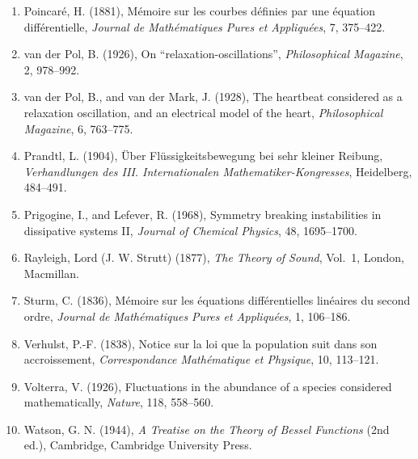 \documentclass[11pt,a4paper]{article}
\numberwithin{equation}{section}
\theoremstyle{definition}
\begin{document}
\begin{enumerate}
\item Poincar\'e, H. (1881), M\'emoire sur les courbes d\'efinies par une \'equation diff\'erentielle, \emph{Journal de Math\'ematiques Pures et
Appliqu\'ees}, 7, 375--422.
\item van der Pol, B. (1926), On ``relaxation-oscillations'', \emph{Philosophical Magazine}, 2, 978--992.
\item van der Pol, B., and van der Mark, J. (1928), The heartbeat considered as a relaxation oscillation, and an electrical model of the heart,
\emph{Philosophical Magazine}, 6, 763--775.
\item Prandtl, L. (1904), \"Uber Fl\"ussigkeitsbewegung bei sehr kleiner Reibung, \emph{Verhandlungen des III. Internationalen
Mathematiker-Kongresses}, Heidelberg, 484--491.
\item Prigogine, I., and Lefever, R. (1968), Symmetry breaking instabilities in dissipative systems II, \emph{Journal of Chemical Physics}, 48,
1695--1700.
\item Rayleigh, Lord (J. W. Strutt) (1877), \emph{The Theory of Sound}, Vol.~1, London, Macmillan.
\item Sturm, C. (1836), M\'emoire sur les \'equations diff\'erentielles lin\'eaires du second ordre, \emph{Journal de Math\'ematiques Pures et
Appliqu\'ees}, 1, 106--186.
\item Verhulst, P.-F. (1838), Notice sur la loi que la population suit dans son accroissement, \emph{Correspondance Math\'ematique et Physique}, 10,
113--121.
\item Volterra, V. (1926), Fluctuations in the abundance of a species considered mathematically, \emph{Nature}, 118, 558--560.
\item Watson, G. N. (1944), \emph{A Treatise on the Theory of Bessel Functions} (2nd ed.), Cambridge, Cambridge University Press.
\end{enumerate}
\end{document}
